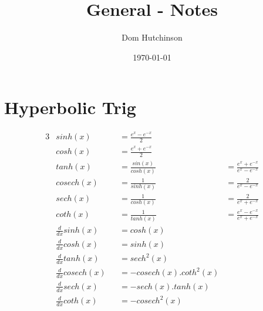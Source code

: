 \documentclass[11pt,a4paper]{article}
\begin{document}
\pagestyle{fancy}
\setlength\parindent{0pt}
\allowdisplaybreaks

\renewcommand{\headrulewidth}{0pt}
\newcommand{\vect}[1]{\boldsymbol{#1}}
\newcommand{\subtitle}[2]{\textbf{#1}\textit{#2} \\}
\newcommand{\dotprod}[0]{\boldsymbol{\cdot}}

\title{General - Notes}
\author{Dom Hutchinson}
\date{\today}
\maketitle

\fancyhead[R]{\today}

\section{Hyperbolic Trig}
\begin{alignat*}{3}
  &sinh(x) &&= \frac{e^{x} - e^{-x}}{2} \\
  &cosh(x) &&= \frac{e^{x} + e^{-x}}{2} \\
  &tanh(x) &&= \frac{sin(x)}{cosh(x)} &= \frac{e^{x} + e^{-x}}{e^{x} - e^{-x}} \\
  &cosech(x) &&= \frac{1}{sinh(x)} &= \frac{2}{e^{x} - e^{-x}} \\
  &sech(x) &&= \frac{1}{cosh(x)} &= \frac{2}{e^{x} + e^{-x}} \\
  &coth(x) &&= \frac{1}{tanh(x)} &= \frac{e^{x} - e^{-x}}{e^{x} + e^{-x}} \\
  &\frac{d}{dx}sinh(x) &&= cosh(x) \\
  &\frac{d}{dx}cosh(x) &&= sinh(x) \\
  &\frac{d}{dx}tanh(x) &&= sech^2(x) \\
  &\frac{d}{dx}cosech(x) &&= -cosech(x).coth^2(x) \\
  &\frac{d}{dx}sech(x) &&= -sech(x).tanh(x) \\
  &\frac{d}{dx}coth(x) &&= -cosech^2(x) \\
\end{alignat*}
\end{document}
